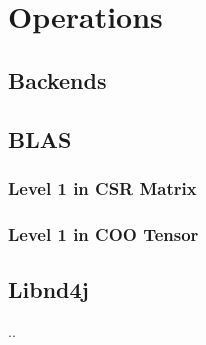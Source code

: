 \chapter{Operations}

\section{Backends}

\section{BLAS}

\subsection{Level 1 in CSR Matrix}

\subsection{Level 1 in COO Tensor}

\section{Libnd4j}
..